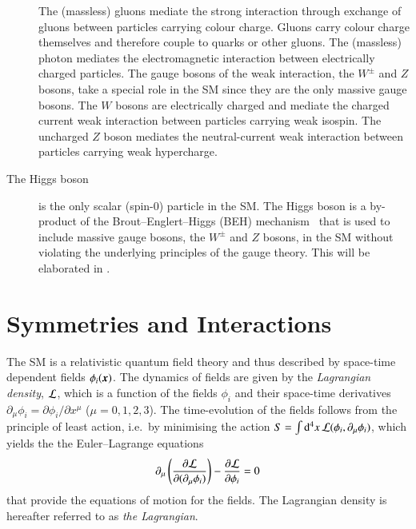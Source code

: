 \begin{description}
  The (massless) gluons mediate the strong interaction through exchange of
  gluons between particles carrying colour charge. Gluons carry colour charge
  themselves and therefore couple to quarks or other gluons. The (massless)
  photon mediates the electromagnetic interaction between electrically charged
  particles. The gauge bosons of the weak interaction, the $W^\pm$ and $Z$
  bosons, take a special role in the SM since they are the only massive gauge
  bosons. The $W$ bosons are electrically charged and mediate the charged
  current weak interaction between particles carrying weak isospin. The
  uncharged $Z$ boson mediates the neutral-current weak interaction between
  particles carrying weak hypercharge.

\item[The Higgs boson] is the only scalar (spin-$0$) particle in the SM. The
  Higgs boson is a by-product of the Brout--Englert--Higgs (BEH)
  mechanism~\cite{Englert:1964et,Higgs:1964pj} that is used to include massive
  gauge bosons, the $W^\pm$ and $Z$ bosons, in the SM without violating the
  underlying principles of the gauge theory. This will be elaborated in
  .

\end{description}


\section{Symmetries and Interactions}
\label{sec:theo_symmetries_interactions}


The SM is a relativistic quantum field theory and thus described by space-time
dependent fields $\phi_i(\myvec{x})$. The dynamics of fields are given by the
\emph{Lagrangian density}, $\mathcal{L}$, which is a function of the fields
$\phi_i$ and their space-time derivatives
$\partial_\mu \phi_i = \partial \phi_i / \partial x^\mu$ ($\mu = 0, 1, 2,
3$). The time-evolution of the fields follows from the principle of least
action, i.e.\ by minimising the action
$S = \int \mathrm{d}^4x \, \mathcal{L}(\phi_i, \partial_\mu \phi_i)$, which yields
the the Euler--Lagrange equations
\begin{align*}
  \partial_{\mu} \left( \frac{\partial \mathcal{L}}{\partial (\partial_{\mu} \phi_i)} \right) - \frac{\partial \mathcal{L}}{\partial \phi_i} = 0
\end{align*} that provide the equations of motion for the fields. The Lagrangian density is
hereafter referred to as \emph{the Lagrangian}.

